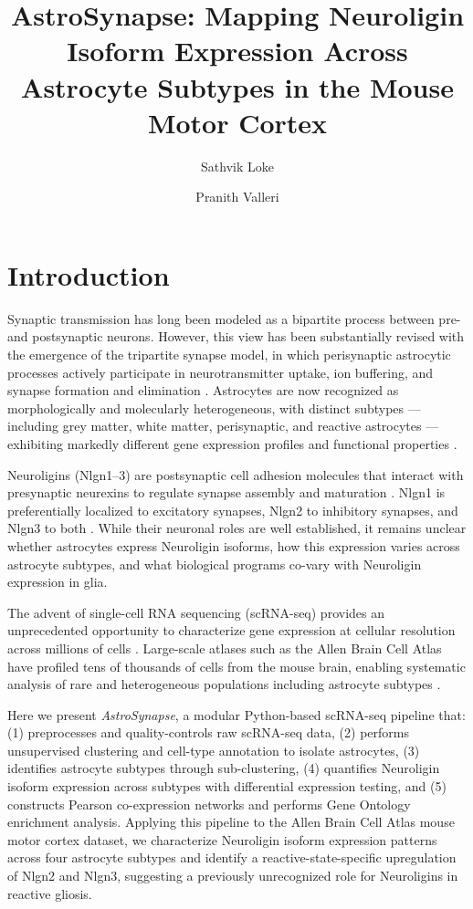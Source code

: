 \documentclass[sigconf]{acmart}
\title{AstroSynapse: Mapping Neuroligin Isoform Expression Across\\Astrocyte Subtypes in the Mouse Motor Cortex}
\author{Sathvik Loke}
\affiliation{%
  \institution{Independent Researcher}
  \city{}
  \country{USA}
}
\author{Pranith Valleri}
\affiliation{%
  \institution{Independent Researcher}
  \city{}
  \country{}
}
\begin{document}
\maketitle

\section{Introduction}

Synaptic transmission has long been modeled as a bipartite process between pre- and postsynaptic neurons. However, this view has been substantially revised with the emergence of the tripartite synapse model, in which perisynaptic astrocytic processes actively participate in neurotransmitter uptake, ion buffering, and synapse formation and elimination \cite{araque1999tripartite, perea2009tripartite}. Astrocytes are now recognized as morphologically and molecularly heterogeneous, with distinct subtypes --- including grey matter, white matter, perisynaptic, and reactive astrocytes --- exhibiting markedly different gene expression profiles and functional properties \cite{bayraktar2020astrocyte, zeisel2018molecular}.

Neuroligins (Nlgn1--3) are postsynaptic cell adhesion molecules that interact with presynaptic neurexins to regulate synapse assembly and maturation \cite{sudhof2008neuroligin, varoqueaux2006neuroligins}. Nlgn1 is preferentially localized to excitatory synapses, Nlgn2 to inhibitory synapses, and Nlgn3 to both \cite{graf2004neurexins, chubykin2007activity}. While their neuronal roles are well established, it remains unclear whether astrocytes express Neuroligin isoforms, how this expression varies across astrocyte subtypes, and what biological programs co-vary with Neuroligin expression in glia.

The advent of single-cell RNA sequencing (scRNA-seq) provides an unprecedented opportunity to characterize gene expression at cellular resolution across millions of cells \cite{wolf2018scanpy}. Large-scale atlases such as the Allen Brain Cell Atlas have profiled tens of thousands of cells from the mouse brain, enabling systematic analysis of rare and heterogeneous populations including astrocyte subtypes \cite{tasic2018shared}.

Here we present \textit{AstroSynapse}, a modular Python-based scRNA-seq pipeline that: (1) preprocesses and quality-controls raw scRNA-seq data, (2) performs unsupervised clustering and cell-type annotation to isolate astrocytes, (3) identifies astrocyte subtypes through sub-clustering, (4) quantifies Neuroligin isoform expression across subtypes with differential expression testing, and (5) constructs Pearson co-expression networks and performs Gene Ontology enrichment analysis. Applying this pipeline to the Allen Brain Cell Atlas mouse motor cortex dataset, we characterize Neuroligin isoform expression patterns across four astrocyte subtypes and identify a reactive-state-specific upregulation of Nlgn2 and Nlgn3, suggesting a previously unrecognized role for Neuroligins in reactive gliosis.
\end{document}
